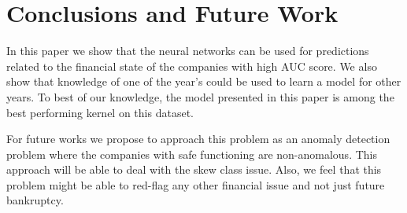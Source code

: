 \section{Conclusions and Future Work}

In this paper we show that the neural networks can be used for predictions related to the financial state of the companies with high AUC score. We also show that knowledge of one of the year's could be used to learn a model for other years. To best of our knowledge, the model presented in this paper is among the best performing kernel on this dataset. 

For future works we propose to approach this problem as an anomaly detection problem where the companies with safe functioning are non-anomalous. This approach will be able to deal with the skew class issue. Also, we feel that this problem might be able to red-flag any other financial issue and not just future bankruptcy.


